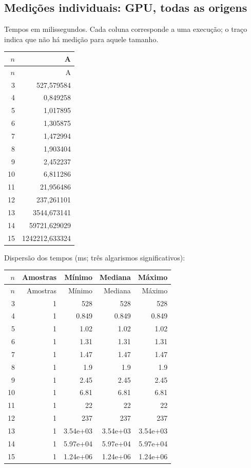 \subsection{Medições individuais: GPU, todas as origens}
Tempos em milissegundos. Cada coluna corresponde a uma execução; o traço indica que não há medição para aquele tamanho.
\begingroup\small\setlength{\tabcolsep}{4pt}
\begin{longtable}{rr}
\toprule
$n$ & A \\
\midrule\endfirsthead
\toprule $n$ & A \\
\midrule\endhead
3 & 527,579584 \\
4 & 0,849258 \\
5 & 1,017895 \\
6 & 1,305875 \\
7 & 1,472994 \\
8 & 1,903404 \\
9 & 2,452237 \\
10 & 6,811286 \\
11 & 21,956486 \\
12 & 237,261101 \\
13 & 3544,673141 \\
14 & 59721,629029 \\
15 & 1242212,633324 \\
\bottomrule
\end{longtable}
\endgroup
\noindent Dispersão dos tempos (ms; três algarismos significativos):
\begin{longtable}{rrrrr}
\toprule
$n$ & Amostras & Mínimo & Mediana & Máximo \\
\midrule\endfirsthead
\toprule
$n$ & Amostras & Mínimo & Mediana & Máximo \\
\midrule\endhead
3 & 1 & 528 & 528 & 528 \\
4 & 1 & 0.849 & 0.849 & 0.849 \\
5 & 1 & 1.02 & 1.02 & 1.02 \\
6 & 1 & 1.31 & 1.31 & 1.31 \\
7 & 1 & 1.47 & 1.47 & 1.47 \\
8 & 1 & 1.9 & 1.9 & 1.9 \\
9 & 1 & 2.45 & 2.45 & 2.45 \\
10 & 1 & 6.81 & 6.81 & 6.81 \\
11 & 1 & 22 & 22 & 22 \\
12 & 1 & 237 & 237 & 237 \\
13 & 1 & 3.54e+03 & 3.54e+03 & 3.54e+03 \\
14 & 1 & 5.97e+04 & 5.97e+04 & 5.97e+04 \\
15 & 1 & 1.24e+06 & 1.24e+06 & 1.24e+06 \\
\bottomrule
\end{longtable}
